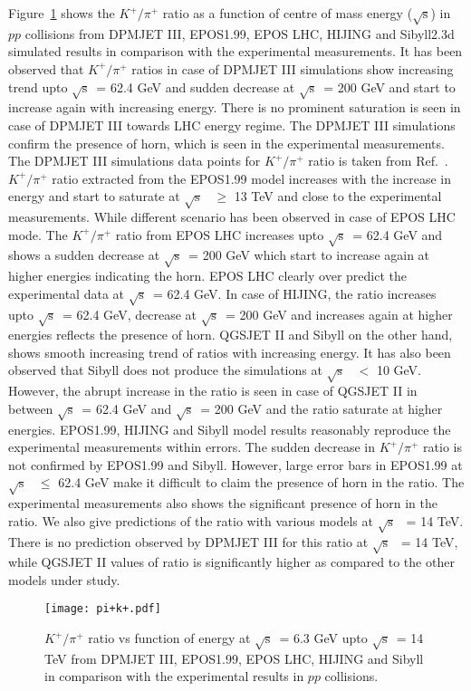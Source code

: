 \documentclass{article}
\newcommand{\sqrts}{\mbox{$\sqrt{\mathrm{s}}$}}
\begin{document}
Figure~\ref{fig1} shows the $K^+/\pi^+$ ratio as a function of centre of mass energy (\sqrts) in $pp$ collisions from DPMJET III, EPOS1.99, EPOS LHC, HIJING and Sibyll2.3d simulated results in comparison with the experimental measurements. It has been observed that $K^+/\pi^+$ ratios in case of DPMJET III simulations show increasing trend upto \sqrts~= 62.4 GeV and sudden decrease at \sqrts~= 200 GeV and start to increase again with increasing energy. There is no prominent saturation is seen in case of DPMJET III towards LHC energy regime. The DPMJET III simulations confirm the presence of horn, which is seen in the experimental measurements. The DPMJET III simulations data points for $K^+/\pi^+$ ratio is taken from Ref.~\cite{Bhattacharyya:2017rmc}. $K^+/\pi^+$ ratio extracted from the EPOS1.99 model increases with the increase in energy and start to saturate at \sqrts~ $\ge$ 13 TeV and close to the experimental measurements. While different scenario has been observed in case of EPOS LHC mode. The $K^+/\pi^+$ ratio from EPOS LHC increases upto \sqrts~= 62.4 GeV and shows a sudden decrease at \sqrts~= 200 GeV which start to increase again at higher energies indicating the horn. EPOS LHC clearly over predict the experimental data at \sqrts~= 62.4 GeV. In case of HIJING, the ratio increases upto \sqrts~= 62.4 GeV, decrease at \sqrts~= 200 GeV and increases again at higher energies reflects the presence of horn. QGSJET II and Sibyll on the other hand, shows smooth increasing trend of ratios with increasing energy. It has also been observed that Sibyll does not produce the simulations at \sqrts~ $<$ 10 GeV. However, the abrupt increase in the ratio is seen in case of QGSJET II in between \sqrts~= 62.4 GeV and \sqrts~= 200 GeV and the ratio saturate at higher energies. EPOS1.99, HIJING and Sibyll model results reasonably reproduce the experimental measurements within errors. The sudden decrease in $K^+/\pi^+$ ratio is not confirmed by EPOS1.99 and Sibyll. However, large error bars in EPOS1.99 at \sqrts~ $\le$ 62.4 GeV make it difficult to claim the presence of horn in the ratio. The experimental measurements also shows the significant presence of horn in the ratio. We also give predictions of the ratio with various models at \sqrts~ = 14 TeV. There is no prediction observed by DPMJET III for this ratio at \sqrts~ = 14 TeV, while QGSJET II values of ratio is significantly higher as compared to the other models under study. 


\begin{figure}[ht!]
\begin{center}
\texttt{[image: pi+k+.pdf]}
\caption{ $K^+/\pi^+$ ratio vs function of energy at \sqrts~= 6.3 GeV upto \sqrts~= 14 TeV from DPMJET III, EPOS1.99, EPOS LHC, HIJING and Sibyll in comparison with the experimental results in $pp$ collisions.}
\label{fig1}
\end{center}
\end{figure}
\end{document}
